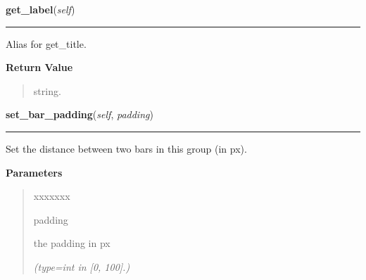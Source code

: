     \label{pygtk_chart:multi_bar_chart:BarGroup:get_label}

    \vspace{0.5ex}

\hspace{.8\funcindent}\begin{boxedminipage}{\funcwidth}

    \raggedright \textbf{get\_label}(\textit{self})

    \vspace{-1.5ex}

    \rule{\textwidth}{0.5\fboxrule}
\setlength{\parskip}{2ex}
    Alias for get\_title.

\setlength{\parskip}{1ex}
      \textbf{Return Value}
    \vspace{-1ex}

      \begin{quote}
      string.

      \end{quote}

    \end{boxedminipage}

    \label{pygtk_chart:multi_bar_chart:BarGroup:set_bar_padding}

    \vspace{0.5ex}

\hspace{.8\funcindent}\begin{boxedminipage}{\funcwidth}

    \raggedright \textbf{set\_bar\_padding}(\textit{self}, \textit{padding})

    \vspace{-1.5ex}

    \rule{\textwidth}{0.5\fboxrule}
\setlength{\parskip}{2ex}
    Set the distance between two bars in this group (in px).

\setlength{\parskip}{1ex}
      \textbf{Parameters}
      \vspace{-1ex}

      \begin{quote}
        \begin{Ventry}{xxxxxxx}

          \item[padding]

          the padding in px

            {\it (type=int in [0, 100].)}

        \end{Ventry}

      \end{quote}

    \end{boxedminipage}

